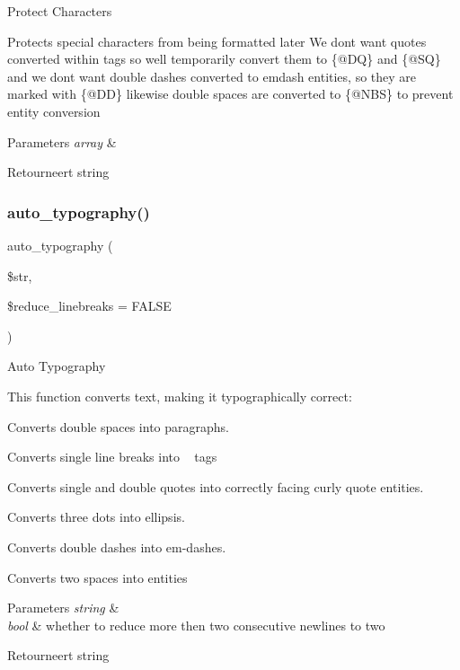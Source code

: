 Protect Characters

Protects special characters from being formatted later We don\textquotesingle{}t want quotes converted within tags so we\textquotesingle{}ll temporarily convert them to \{@\+DQ\} and \{@\+SQ\} and we don\textquotesingle{}t want double dashes converted to emdash entities, so they are marked with \{@\+DD\} likewise double spaces are converted to \{@\+N\+BS\} to prevent entity conversion


\begin{DoxyParams}{Parameters}
{\em array} & \\
\hline
\end{DoxyParams}
\begin{DoxyReturn}{Retourneert}
string 
\end{DoxyReturn}
\mbox{\label{class_c_i___typography_a24c284b560f34d6c7fad07e36baaa024}} 
\subsubsection{\texorpdfstring{auto\_typography()}{auto\_typography()}}
{\footnotesize\ttfamily auto\+\_\+typography (\begin{DoxyParamCaption}\item[{}]{\$str,  }\item[{}]{\$reduce\+\_\+linebreaks = {\ttfamily FALSE} }\end{DoxyParamCaption})}

Auto Typography

This function converts text, making it typographically correct\+:
\begin{DoxyItemize}
\item Converts double spaces into paragraphs.
\item Converts single line breaks into ~\newline
 tags
\item Converts single and double quotes into correctly facing curly quote entities.
\item Converts three dots into ellipsis.
\item Converts double dashes into em-\/dashes.
\item Converts two spaces into entities
\end{DoxyItemize}


\begin{DoxyParams}{Parameters}
{\em string} & \\
\hline
{\em bool} & whether to reduce more then two consecutive newlines to two \\
\hline
\end{DoxyParams}
\begin{DoxyReturn}{Retourneert}
string 
\end{DoxyReturn}
\mbox{\label{class_c_i___typography_a45df135c8811c2b27085dbdfd05a1eed}} 
